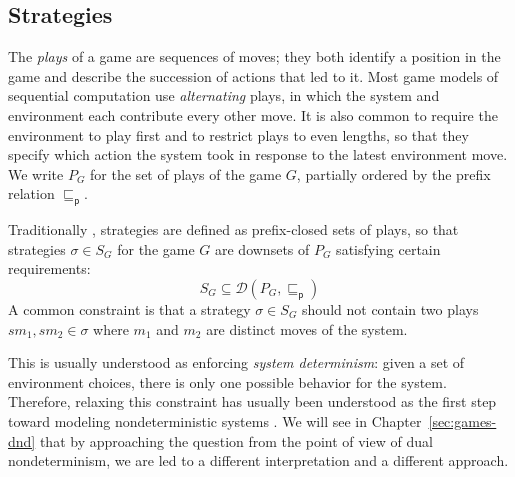 \documentclass[11pt,oneside,draft]{book}
\theoremstyle{definition}
\newcommand{\kw}[1]{\ensuremath{ \mathsf{#1} }}
\newcommand{\pref}{\sqsubseteq_\kw{p}}  %
\begin{document}

\subsection{Strategies} \label{sec:bg:strat} %

The \emph{plays} of a game are sequences of moves;
they both identify a position in the game
and describe the succession of actions that led to it.
Most game models of sequential computation
use \emph{alternating} plays,
in which
the system and environment each contribute
every other move.
It is also common to require the environment to play first
and to restrict plays to even lengths,
so that they specify which action the system took
in response to the latest environment move.
We write $P_G$ for the set of plays of the game $G$,
partially ordered by the prefix relation $\pref$.

Traditionally \citep{gamesem99},
strategies are defined as
prefix-closed sets of plays,
so that strategies $\sigma \in S_G$
for the game $G$ are downsets of $P_G$
satisfying certain requirements:
\[
    S_G \subseteq
    \mathcal{D}(P_G, {\pref})
\]
A common constraint is that a strategy $\sigma \in S_G$
should not contain two plays $s m_1, s m_2 \in \sigma$
where $m_1$ and $m_2$ are distinct moves of the system.

This is usually understood as
enforcing \emph{system determinism}:
given a set of environment choices,
there is only one possible behavior for the system.
Therefore,
relaxing this constraint has usually been understood
as the first step toward modeling nondeterministic systems
\citep{gsfnd}.
We will see in Chapter~\ref{sec:games-dnd}
that by approaching the question
from the point of view of dual nondeterminism,
we are led to a different interpretation and a different approach.

%
\end{document}
